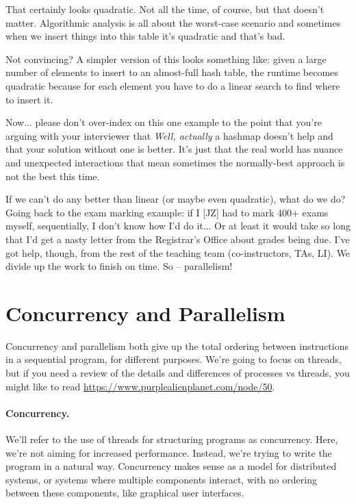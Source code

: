 That certainly looks quadratic. Not all the time, of course, but that doesn't matter. Algorithmic analysis is all about the worst-case scenario and sometimes when we insert things into this table it's quadratic and that's bad. 

Not convincing? A simpler version of this looks something like: given a large number of elements to insert to an almost-full hash table, the runtime becomes quadratic because for each element you have to do a linear search to find where to insert it.

Now... please don't over-index on this one example to the point that you're arguing with your interviewer that \textit{Well, actually} a hashmap doesn't help and that your solution without one is better. It's just that the real world has nuance and unexpected interactions that mean sometimes the normally-best approach is not the best this time. 

If we can't do any better than linear (or maybe even quadratic), what do we do? Going back to the exam marking example: if I [JZ] had to mark 400+ exams myself, sequentially, I don't know how I'd do it... Or at least it would take so long that I'd get a nasty letter from the Registrar's Office about grades being due. I've got help, though, from the rest of the teaching team (co-instructors, TAs, LI). We divide up the work to finish on time. So -- parallelism!


\section*{Concurrency and Parallelism}
Concurrency and parallelism both give up the
total ordering between instructions in a sequential program, for
different purposes. We're going to focus on threads, but if you need a review of the details and differences of processes vs threads, you might like to read   \url{https://www.purplealienplanet.com/node/50}. 

\paragraph{Concurrency.} We'll refer to the use of threads for
structuring programs as concurrency. Here, we're not aiming
for increased performance. Instead, we're trying to write the program
in a natural way. Concurrency makes sense as a model for distributed
systems, or systems where multiple components interact, with no ordering
between these components, like graphical user interfaces.

